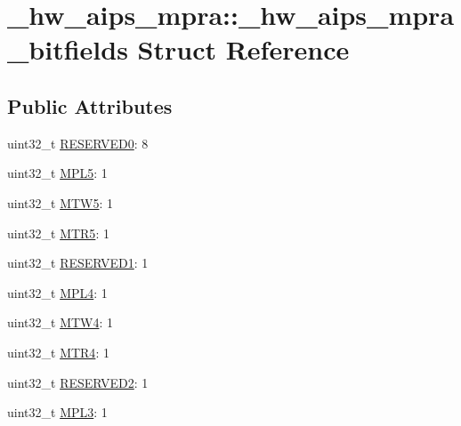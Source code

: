 \hypertarget{struct__hw__aips__mpra_1_1__hw__aips__mpra__bitfields}{}\section{\+\_\+hw\+\_\+aips\+\_\+mpra\+:\+:\+\_\+hw\+\_\+aips\+\_\+mpra\+\_\+bitfields Struct Reference}
\label{struct__hw__aips__mpra_1_1__hw__aips__mpra__bitfields}
\subsection*{Public Attributes}
\begin{DoxyCompactItemize}
\item 
uint32\+\_\+t \hyperlink{struct__hw__aips__mpra_1_1__hw__aips__mpra__bitfields_a9e6185e9dbc1f9e1c81d63741362568d}{R\+E\+S\+E\+R\+V\+E\+D0}\+: 8
\item 
uint32\+\_\+t \hyperlink{struct__hw__aips__mpra_1_1__hw__aips__mpra__bitfields_a3547e69fbf063d7bbf37301350090ecc}{M\+P\+L5}\+: 1
\item 
uint32\+\_\+t \hyperlink{struct__hw__aips__mpra_1_1__hw__aips__mpra__bitfields_a226e0bc76f52e35f1c30fbbebd506b27}{M\+T\+W5}\+: 1
\item 
uint32\+\_\+t \hyperlink{struct__hw__aips__mpra_1_1__hw__aips__mpra__bitfields_ac30ef3692a06ba8b4b24bf856560d1f8}{M\+T\+R5}\+: 1
\item 
uint32\+\_\+t \hyperlink{struct__hw__aips__mpra_1_1__hw__aips__mpra__bitfields_ad2ce67f3d021c8e6dd9f1cca4878f8de}{R\+E\+S\+E\+R\+V\+E\+D1}\+: 1
\item 
uint32\+\_\+t \hyperlink{struct__hw__aips__mpra_1_1__hw__aips__mpra__bitfields_a4755ae00fe6a55d9b49177a0f7f66a88}{M\+P\+L4}\+: 1
\item 
uint32\+\_\+t \hyperlink{struct__hw__aips__mpra_1_1__hw__aips__mpra__bitfields_aac4ab63029ef2895fa88f96011ff4e65}{M\+T\+W4}\+: 1
\item 
uint32\+\_\+t \hyperlink{struct__hw__aips__mpra_1_1__hw__aips__mpra__bitfields_a458b2020ef06d05625ab661e8c355558}{M\+T\+R4}\+: 1
\item 
uint32\+\_\+t \hyperlink{struct__hw__aips__mpra_1_1__hw__aips__mpra__bitfields_a1a8bd8d890380ddf98b8142abc7025bb}{R\+E\+S\+E\+R\+V\+E\+D2}\+: 1
\item 
uint32\+\_\+t \hyperlink{struct__hw__aips__mpra_1_1__hw__aips__mpra__bitfields_a7863d9426d24dedfa85244d38b301067}{M\+P\+L3}\+: 1

\end{DoxyCompactItemize}
